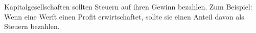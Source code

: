 Kapitalgesellschaften sollten Steuern auf ihren Gewinn bezahlen.
Zum Beispiel:
Wenn eine Werft einen Profit erwirtschaftet, sollte sie einen Anteil davon als Steuern bezahlen.